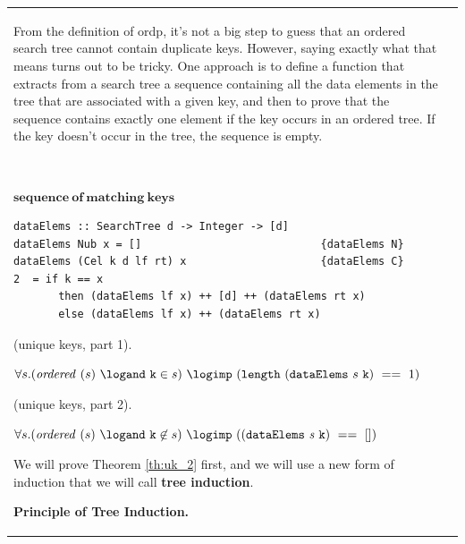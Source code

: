\begin{tabular}{ll}
From the definition of ordp, it's not a big step to
guess that an ordered search tree cannot contain duplicate keys.
However, saying exactly what that means turns out to be tricky. One
approach is to define a function that extracts from a search tree a
sequence containing all the data elements in the tree that are
associated with a given key, and then to prove that the sequence
contains exactly one element if the key occurs in an ordered tree.
If the key doesn't occur in the tree, the sequence is empty.

$\ $\newline $\ $\newline

 $\mathbf{sequence}\ \mathbf{of}\  \mathbf{matching}\
\mathbf{keys}$\newline

\begin{verbatim}
dataElems :: SearchTree d -> Integer -> [d]
dataElems Nub x = []                            {dataElems N}
dataElems (Cel k d lf rt) x                     {dataElems C}
2  = if k == x
       then (dataElems lf x) ++ [d] ++ (dataElems rt x)
       else (dataElems lf x) ++ (dataElems rt x)
\end{verbatim}

\begin{theorem}
\label{th:uk_1}

(unique keys, part 1).

$\forall s. (\mathit{ordered}\ (s)\  \logand\   \mathtt{k} \in s)\
\logimp\  (\mathtt{length}\ (\mathtt{dataElems}\  s\  \mathtt{k})\
==\  1)$

\end{theorem}

\begin{theorem}
\label{th:uk_2}

(unique keys, part 2).

$\forall s. (\mathit{ordered}\ (s)\  \logand\   \mathtt{k} \not\in
s)\  \logimp\  ((\mathtt{dataElems}\  \mathit{s}\  \mathtt{k})\  ==\
[ ])$

\end{theorem}

We will prove\index{$\mathtt{dataElems}$} Theorem \ref{th:uk_2}
first, and we will use a new form of induction that we will call
{\bf tree induction}\index{tree induction}.


\medskip
\noindent\textbf{Principle of Tree Induction.}


\end{tabular}
